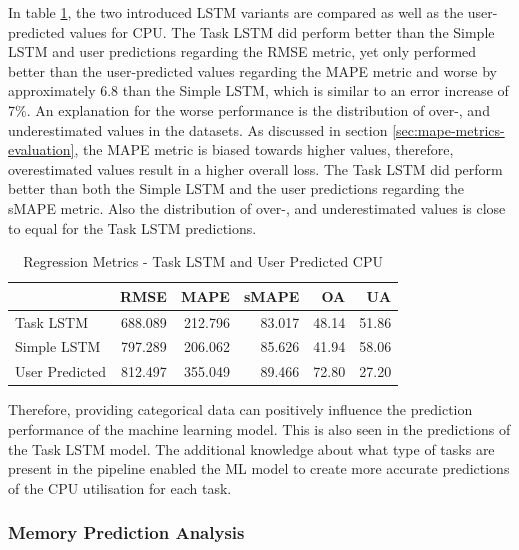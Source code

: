       In table \ref{tab:regression-metrics-task-lstm-user-predicted-cpu}, the two introduced LSTM variants are compared as well as the user-predicted values for CPU.
      The Task LSTM did perform better than the Simple LSTM and user predictions regarding the RMSE metric, yet only performed better than the user-predicted values regarding the MAPE metric and worse by approximately $6.8$ than the Simple LSTM, which is similar to an error increase of 7\%. An explanation for the worse performance is the distribution of over-, and underestimated values in the datasets. As discussed in section \ref{sec:mape-metrics-evaluation}, the MAPE metric is biased towards higher values, therefore, overestimated values result in a higher overall loss.
      The Task LSTM did perform better than both the Simple LSTM and the user predictions regarding the sMAPE metric.
      Also the distribution of over-, and underestimated values is close to equal for the Task LSTM predictions.

      \begin{table}
        \centering
        \caption{Regression Metrics - Task LSTM and User Predicted CPU}
        \label{tab:regression-metrics-task-lstm-user-predicted-cpu}
        \begin{tabular}{|l|rrrrr|}
          \toprule
          {} &     RMSE &     MAPE &   sMAPE &     OA &     UA \\
          \midrule
          Task LSTM   &  688.089 &  212.796 &  83.017 &  48.14 &  51.86 \\
          Simple LSTM &  797.289 &  206.062 &  85.626 &  41.94 &  58.06 \\
          User Predicted &  812.497 &  355.049 &  89.466 &  72.80 &  27.20 \\
          \bottomrule
        \end{tabular}
      \end{table}

      Therefore, providing categorical data can positively influence the prediction performance of the machine learning model. This is also seen in the predictions of the Task LSTM model. The additional knowledge about what type of tasks are present in the pipeline enabled the ML model to create more accurate predictions of the CPU utilisation for each task.
      

    \subsubsection{Memory Prediction Analysis}
    \label{sec:mem-prediction-analysis-task-knowledge-lstm-evaluation-scenarios}

